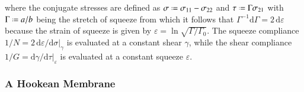 where the conjugate stresses are defined as $\sigma \defeq \sigma_{11} - \sigma_{22}$ and $\tau \defeq \Gamma \sigma_{21}$ with $\Gamma \defeq a/b$ being the stretch of squeeze from which it follows that $\Gamma^{-1} \mathrm{d} \Gamma = 2 \, \mathrm{d} \varepsilon$ because the strain of squeeze is given by $\varepsilon = \ln \sqrt{ \Gamma / \Gamma_0 }$.  The squeeze compliance $1/N = 2 \, \mathrm{d} \varepsilon / \mathrm{d} \sigma |_{\gamma}$ is evaluated at a constant shear $\gamma$, while the shear compliance $1/G = \mathrm{d} \gamma / \mathrm{d} \tau |_{\varepsilon}$ is evaluated at a constant squeeze $\varepsilon$.

\subsubsection{A Hookean Membrane}

